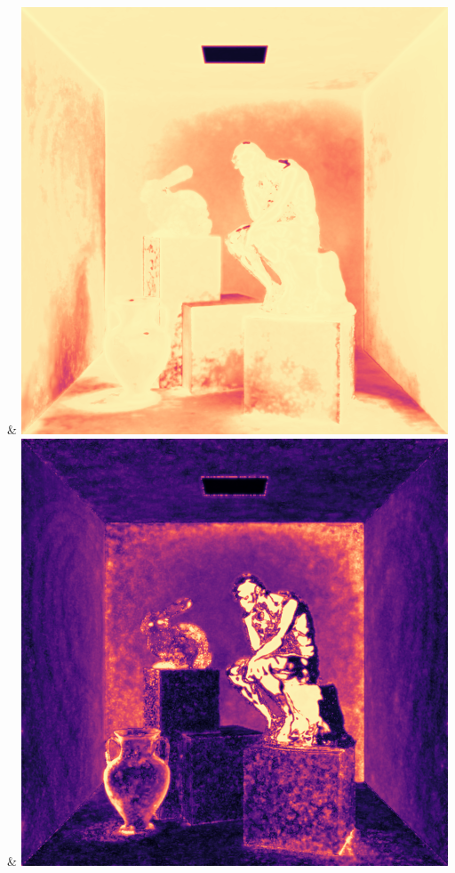 & \includegraphics[width=\linewidth]{figures/py/tests/quality_comparison/nrc+lt_1spp_thinker_flip.png}
& \includegraphics[width=\linewidth]{figures/py/tests/quality_comparison/nrc+sppc_1spp_thinker_flip.png}
